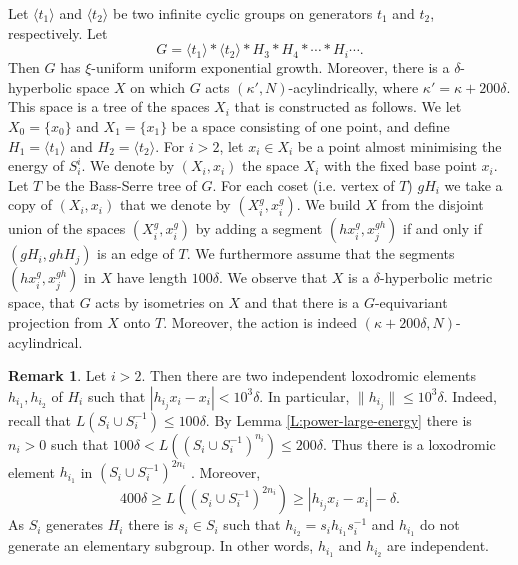 \documentclass[leqno,a4paper,10pt]{amsart}
\theoremstyle{plain}
\theoremstyle{definition}
\newtheorem{rem}[thm]{Remark}
\theoremstyle{remark}
\begin{document}
Let $\langle t_1\rangle$ and $\langle t_2\rangle$ be two infinite cyclic groups on generators $t_1$ and $t_2$, respectively. Let 
$$G=\langle t_1 \rangle * \langle t_2\rangle * H_3*H_4* \cdots * H_i \cdots .$$
Then $G$ has $\xi$-uniform uniform exponential growth. 
Moreover, there is a $\delta$-hyperbolic space $X$ on which $G$ acts $(\kappa',N)$-acylindrically, where $\kappa'=\kappa+200\delta$. This space is a tree of the spaces $X_i$ that is constructed as follows. 
We let $X_0=\{x_0\}$ and $X_1=\{x_1\}$ be a space consisting of one point, and define $H_1=\langle t_1 \rangle$ and $H_2=\langle t_2 \rangle$. For $i>2$, let $x_i\in X_i$ be a point almost minimising the energy of $S_i^i$. We denote by $(X_i,x_i)$ the space $X_i$ with the fixed base point $x_i$. Let $T$ be the Bass-Serre tree of $G$. For each coset (i.e. vertex of $T$) $gH_i$ we take a copy of $(X_i,x_i)$ that we denote by $(X_i^g,x_i^g)$. We build $X$ from the disjoint union of the spaces $(X_i^g,x_i^g)$ by adding a segment $(hx_{i}^g,x_j^{gh})$ if and only if  $(gH_i,ghH_j)$ is an edge of $T$. We furthermore assume that the segments $(hx_{i}^g,x_j^{gh})$ in $X$ have length $100\delta$.  We  observe that $X$ is a $\delta$-hyperbolic metric space, that $G$ acts by isometries on $X$ and  that there is a $G$-equivariant projection from $X$ onto $T$. Moreover, the action is indeed $(\kappa+200\delta,N)$-acylindrical. 

\begin{rem}\label{R:independent} Let $i>2$. Then there are two independent loxodromic elements $h_{i_1},h_{i_2}$ of $H_i$ such that $|h_{i_j}x_i-x_i| < 10^3\delta$. In particular, $\|h_{i_j}\|\leqslant 10^3\delta$. Indeed, recall that $L(S_i\cup S_i^{-1})\leqslant 100 \delta$. By Lemma \ref{L:power-large-energy} there is $n_i>0$ such that $100\delta < L\left((S_i\cup S_i^{-1})^{n_i}\right) \leqslant 200 \delta$. Thus there is a loxodromic element $h_{i_1}$ in $(S_i\cup S_i^{-1})^{2n_i}$ \cite[Proposition 3.2]{koubi_croissance_1998}. Moreover, 
$$ 400\delta \geqslant L\left((S_i\cup S_i^{-1})^{2n_i}\right)\geqslant |h_{i_j}x_i-x_i|-\delta .$$
As $S_i$ generates $H_i$ there is $s_i\in S_i$ such that $h_{i_2}=s_ih_{i_1}s_i^{-1}$ and $h_{i_1}$ do not generate an elementary subgroup. In other words, $h_{i_1}$ and ${h_{i_2}}$ are independent. 
\end{rem}
\end{document}
